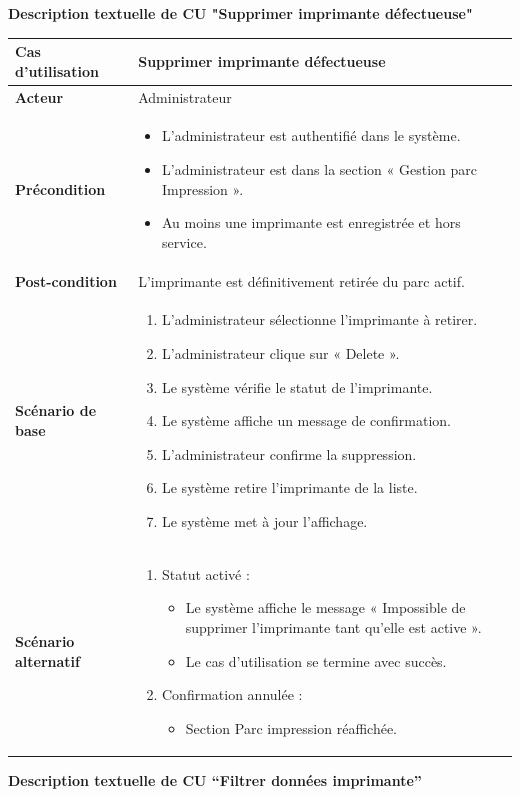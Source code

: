 \documentclass[a4paper,11pt]{report}
\begin{document}
\newpage
\textbf{Description textuelle de CU "Supprimer imprimante défectueuse"}

\begin{tabularx}{\textwidth}{|>{\bfseries}l|X|}
\hline
Cas d’utilisation    & Supprimer imprimante défectueuse \\
\hline
Acteur               & Administrateur \\
\hline
Précondition         &
\begin{itemize}[left=0pt]
  \item L’administrateur est authentifié dans le système.
  \item L’administrateur est dans la section « Gestion parc Impression ».
  \item Au moins une imprimante est enregistrée et hors service.
\end{itemize} \\
\hline
Post-condition       & L’imprimante est définitivement retirée du parc actif. \\
\hline
Scénario de base     &
\begin{enumerate}[left=0pt]
  \item L’administrateur sélectionne l’imprimante à retirer.
  \item L’administrateur clique sur « Delete ».
  \item Le système vérifie le statut de l’imprimante.
  \item Le système affiche un message de confirmation.
  \item L’administrateur confirme la suppression.
  \item Le système retire l’imprimante de la liste.
  \item Le système met à jour l’affichage.
\end{enumerate} \\
\hline
Scénario alternatif  &
\begin{enumerate}[label=\arabic*.a,wide=0pt]
  \item[3.a] Statut activé :
    \begin{itemize}[left=1em]
      \item Le système affiche le message « Impossible de supprimer l’imprimante tant qu’elle est active ».
      \item Le cas d’utilisation se termine avec succès.
    \end{itemize}
  \item[5.a] Confirmation annulée :
    \begin{itemize}[left=1em]
      \item Section Parc impression réaffichée.
    \end{itemize}
\end{enumerate} \\
\hline
\end{tabularx}
\begingroup
\setlength{\parskip}{0.5em}   %
\setlength{\parindent}{0pt}   %
\newpage
\textbf{Description textuelle de CU ``Filtrer données imprimante''}
\end{document}
